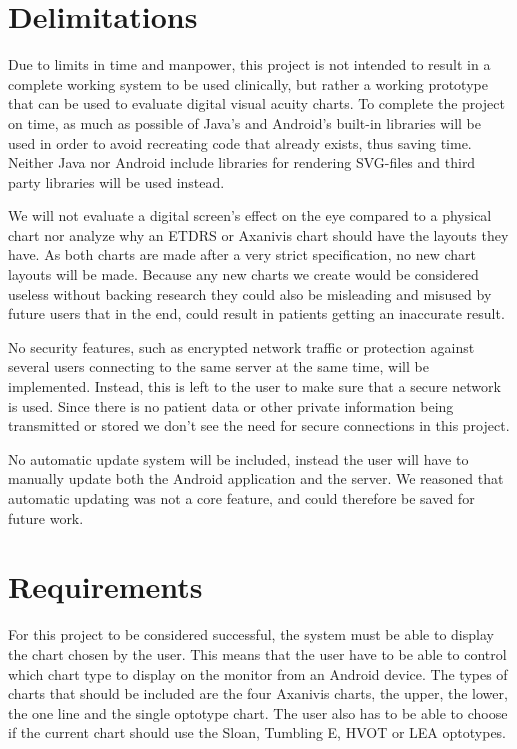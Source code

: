 \documentclass[12pt,a4paper,notitlepage]{report}
\begin{document}
\section{Delimitations}
Due to limits in time and manpower, this project is not intended to result in a complete working system to be used clinically, but rather a working prototype that can be used to evaluate digital visual acuity charts. To complete the project on time, as much as possible of Java's and Android's built-in libraries will be used in order to avoid recreating code that already exists, thus saving time. Neither Java nor Android include libraries for rendering SVG-files and third party libraries will be used instead.


We will not evaluate a digital screen's effect on the eye compared to a physical chart nor analyze why an ETDRS or Axanivis chart should have the layouts they have. As both charts are made after a very strict specification, no new chart layouts will be made. Because any new charts we create would be considered useless without backing research they could also be misleading and misused by future users that in the end, could result in patients getting an inaccurate result.

No security features, such as encrypted network traffic or protection against several users connecting to the same server at the same time, will be implemented. Instead, this is left to the user to make sure that a secure network is used. Since there is no patient data or other private information being transmitted or stored we don't see the need for secure connections in this project.

No automatic update system will be included, instead the user will have to manually update both the Android application and the server. We reasoned that automatic updating was not a core feature, and could therefore be saved for future work.

\section{Requirements}
For this project to be considered successful, the system must be able to display the chart chosen by the user. This means that the user have to be able to control which chart type to display on the monitor from an Android device. The types of charts that should be included are the four Axanivis charts, the upper, the lower, the one line and the single optotype chart. The user also has to be able to choose if the current chart should use the Sloan, Tumbling E, HVOT or LEA optotypes.
\end{document}
